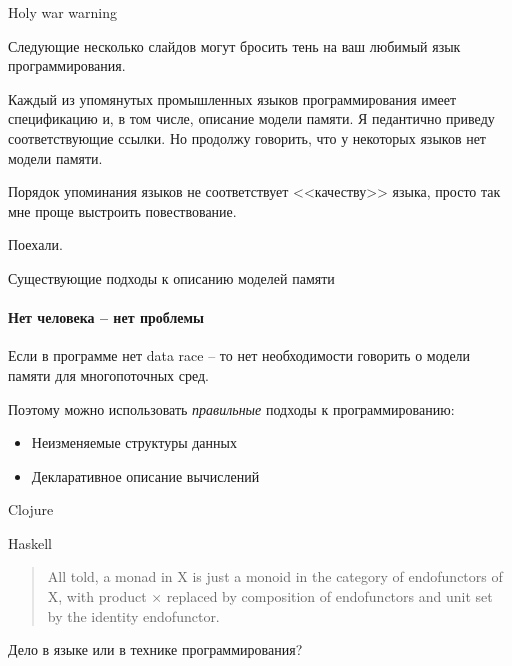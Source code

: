 \begin{frame}{Holy war warning}

Следующие несколько слайдов могут бросить тень на ваш любимый язык программирования.

\pause

Каждый из упомянутых промышленных языков программирования имеет спецификацию и, в том числе, описание модели памяти. Я педантично приведу соответствующие ссылки.
Но продолжу говорить, что у некоторых языков нет модели памяти.

\pause
\pause

Порядок упоминания языков не соответствует <<качеству>> языка, просто так мне проще выстроить повествование.

\pause

Поехали.

\end{frame}


\begin{frame}[fragile, t]{Существующие подходы к описанию моделей памяти}
\framesubtitle{Нет человека -- нет проблемы}

Если в программе нет data race -- то нет необходимости говорить о модели памяти для многопоточных сред.

\pause

Поэтому можно использовать \textit{правильные} подходы к программированию:
\begin{itemize}
	\pause
	\item Неизменяемые структуры данных

	\pause
	\item Декларативное описание вычислений
\end{itemize}

\pause
Clojure

\pause
Haskell

\pause
\begin{quote}
All told, a monad in X is just a monoid in the category of endofunctors of X, with product × replaced by composition of endofunctors and unit set by the identity endofunctor.
\end{quote}

\pause
Дело в языке или в технике программирования?

\end{frame}


